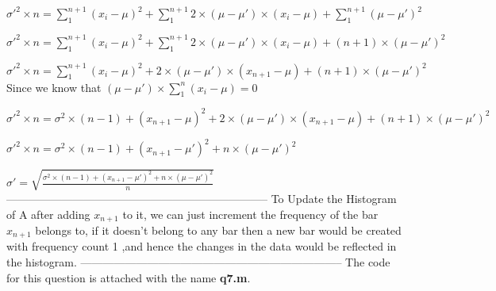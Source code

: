 \documentclass{article}
\begin{document}
    \par 
    $\sigma'^2 \times n =
\sum_1^{n+1} {(x_i-\mu)}^2+\sum_1^{n+1} 2\times{(\mu-\mu')}\times{(x_i-\mu)}+\sum_1^{n+1}{(\mu-\mu')}^2 $
    \par 
    $\sigma'^2 \times n =
\sum_1^{n+1} {(x_i-\mu)}^2+\sum_1^{n+1} 2\times{(\mu-\mu')}\times{(x_i-\mu)}+(n+1)\times {(\mu-\mu')}^2 $
    \par 
    $\sigma'^2 \times n =
\sum_1^{n+1} {(x_i-\mu)}^2+ 2\times{(\mu-\mu')}\times{(x_{n+1}-\mu)}+(n+1)\times {(\mu-\mu')}^2 $
    \newline Since we know that ${(\mu-\mu')}\times \sum_1^n {(x_i-\mu)} = 0$
    \par 
    $\sigma'^2 \times n =
\sigma^2\times(n-1)+{(x_{n+1}-\mu)}^2+ 2\times{(\mu-\mu')}\times{(x_{n+1}-\mu)}+(n+1)\times {(\mu-\mu')}^2 $
    \par
    $\sigma'^2 \times n =
\sigma^2\times(n-1)+{(x_{n+1}-\mu')}^2+ n\times {(\mu-\mu')}^2 $
    \par 
    $\sigma'=\sqrt{\frac{\sigma^2\times(n-1)+{(x_{n+1}-\mu')}^2+ n\times {(\mu-\mu')}^2}{n}}$
    \newline
    -----------------------------------------------------------------------
    \newline
    To Update the Histogram of A after adding $x_{n+1}$ to it, we can just increment the frequency of the bar $x_{n+1}$ belongs to, if it doesn't belong to any bar then a new bar would be created with frequency count 1 ,and hence the changes in the data would be reflected in the histogram. 
    \newline
    -----------------------------------------------------------------------
    \newline
    The code for this question is attached with the name \textbf{q7.m}.
\end{document}
